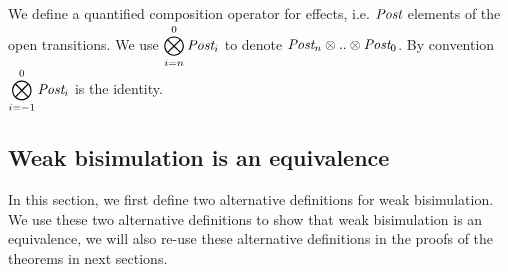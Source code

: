 \documentclass{lmcs}
\begin{document}
We  define a quantified composition operator for effects, i.e. $\Post$ elements of the open transitions.
We use ${\displaystyle \bigotimes_{i=n}^{0} \Post_i}$ to denote  $\Post_n\otimes .. \otimes \Post_0$. By convention ${\displaystyle \bigotimes_{i=-1}^{0} \Post_i}$ is the identity. 



\subsection{Weak bisimulation is an equivalence}\label{app-WFH-equiv}

In this section, we first define two alternative definitions for weak bisimulation. We use these two alternative definitions to show that weak bisimulation is an equivalence, we will also re-use these alternative definitions in the  proofs of the theorems in next sections.
\end{document}
